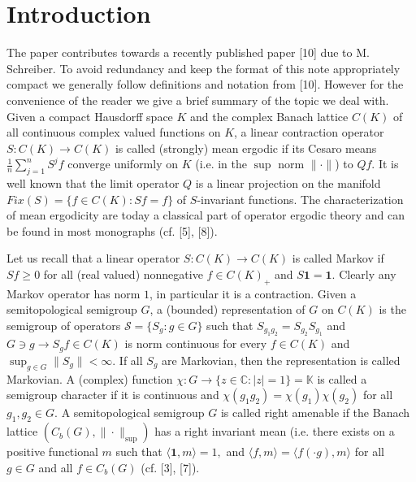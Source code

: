 \documentclass{amsart}
\theoremstyle{definition}
\theoremstyle{remark}
\numberwithin{equation}{section}
\begin{document}
\section{Introduction}

The paper contributes towards  a recently published  paper [10] due to M. Schreiber. To avoid redundancy and keep the format of this note appropriately compact we generally follow definitions and notation from [10]. However for the convenience of the reader we give a brief summary of the topic we deal with. Given a compact Hausdorff space $K$ and the complex Banach lattice $C(K)$ of all continuous complex valued functions on $K$, a linear contraction operator $S : C(K) \to C(K)$ is called (strongly) mean ergodic if its Cesaro means $\frac{1}{n}\sum_{j=1}^n S^jf $ converge uniformly  on $K$ (i.e. in the $\sup $ norm $\| \cdot \|$)  to $Qf$. It is well known that the limit operator $Q$ is a linear projection on the manifold $Fix(S) = \{ f\in C(K) : Sf = f \}$ of $S$-invariant functions. The characterization of  mean ergodicity are today a classical part of operator ergodic theory and can be found in most monographs (cf. [5], [8]).

Let us recall that a linear operator $S : C(K) \to C(K)$ is called Markov if $Sf\geq 0$ for all (real valued) nonnegative  $f\in C(K)_+$ and $S\mathbf{1} = \mathbf{1}$. Clearly any Markov operator has norm $1$, in particular it is a contraction. Given a semitopological semigroup $G$, a (bounded) representation of $G$ on $C(K)$ is the semigroup of operators $\mathcal{S} = \{ S_g : g\in G \}$ such that $S_{g_1g_2} = S_{g_2}S_{g_1}$ and $G \ni g \to S_gf \in C(K)$ is norm continuous for every $f\in C(K)$ and $\sup_{g\in G} \| S_g \| < \infty$. If all $S_g$ are Markovian, then the representation is called Markovian. A (complex) function $\chi : G \to \{ z\in \mathbb{C} : |z| = 1 \} = \mathbb{K} $ is called a semigroup character if it is continuous and $\chi(g_1g_2) = \chi (g_1)\chi (g_2)$ for all $g_1, g_2 \in G$. A semitopological semigroup $G$ is called right amenable if the Banach lattice  $(C_b(G), \| \cdot \|_{\sup}) $ has a right invariant mean (i.e. there exists on  a positive functional $m$ such that $\langle \mathbf{1} , m \rangle  = 1, $ and $\langle f, m \rangle = \langle f(\cdot g), m \rangle  $ for all $g\in G $ and all $f\in C_b(G)$ (cf. [3], [7]).
\end{document}
